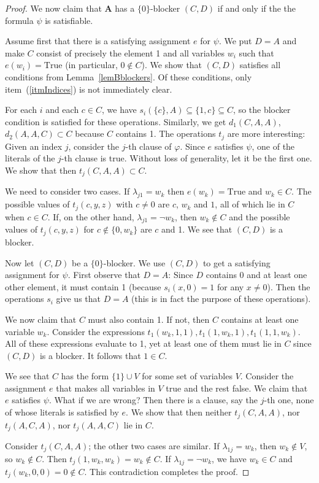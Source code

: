 \documentclass{amsart}
\let\phi\varphi
\theoremstyle{plain}
\theoremstyle{definition}
\begin{document}
\begin{proof}
    We now claim that ${{\mathbf{A}}}$ has a $\{0\}$-blocker $(C,D)$ if and only if the the formula
  $\psi$ is satisfiable. 

  Assume first that there is a satisfying assignment $e$ for $\psi$. We put
  $D=A$ and make $C$ consist of precisely the element 1 and all variables
  $w_i$ such that $e(w_i)={\mathrm{True}}$ (in particular, $0\not\in C$). We show that
  $(C,D)$ satisfies all conditions from Lemma~\ref{lemBblockers}. Of
  these conditions, only item~(\ref{itmIndices}) is not immediately clear.

  For each $i$ and each $c \in C$, we have $s_i(\{c\},A) \subseteq \{1,c\} \subseteq C$, so the blocker
  condition is satisfied for these operations. Similarly, we get
  $d_1(C,A,A)$,
  $d_2(A,A,C)\subset C$ because $C$ contains 1.   The operations $t_j$ are more
  interesting: Given an index $j$, consider the $j$-th clause of $\phi$. Since
  $e$ satisfies $\psi$, one of the literals of the $j$-th clause is true. Without
  loss of generality, let it be the first one. We show that then
  $t_j(C,A,A)\subset C$.

  We need to consider two cases. If $\lambda_{j1}=w_k$ then $e(w_k)={\mathrm{True}}$ and
  $w_k\in C$. The possible values of
  $t_j(c,y,z)$ with $c\neq 0$ are $c$, $w_k$ and $1$, all of which lie in $C$ when $c \in C$. If,
  on the other hand, $\lambda_{j1}=\neg w_k$, then $w_k\not\in C$ and the possible values of
  $t_j(c,y,z)$ for $c\not \in\{0,w_k\}$ are $c$ and 1. We see that $(C,D)$ is a blocker.

  Now let $(C,D)$ be a $\{0\}$-blocker. We use $(C,D)$ to get a satisfying
  assignment for $\psi$. First observe that $D=A$: Since $D$ contains 0 and at
  least one other element, it must contain 1 (because $s_i(x,0)=1$ for any
  $x\neq 0$). Then the operations $s_i$ give us that $D=A$ (this is in fact the purpose
  of these operations).

  We now claim that $C$ must also contain 1. If not, then $C$ contains at
  least one variable $w_k$. Consider the expressions
  $t_1(w_k,1,1),t_1(1,w_k,1),t_1(1,1,w_k)$. All of these expressions evaluate to
  1, yet at least one of them must lie in $C$ since $(C,D)$ is a blocker. It
  follows that $1\in C$.

  We see that $C$ has the form $\{1\}\cup V$ for some set of variables $V$.
  Consider the assignment $e$ that makes all variables in $V$ true and the
  rest false. We claim that $e$ satisfies $\psi$. 
	What if we are wrong? Then
  there is a clause, say the $j$-th one, none of whose literals is satisfied by
  $e$. We show that then neither $t_j(C,A,A)$, nor $t_j(A,C,A)$, nor $t_j(A,A,C)$
  lie in $C$. 

  Consider $t_j(C,A,A)$; the other two cases are similar. If $\lambda_{1j}=w_k$, then $w_k\not \in V$, so
  $w_k\not\in C$. Then $t_j(1,w_k,w_k)=w_k\not\in C$. If $\lambda_{1j}=\neg w_k$,
  we have $w_k\in C$ and $t_j(w_k,0,0)=0\not \in C$. This contradiction completes the proof.
\end{proof}
\end{document}
